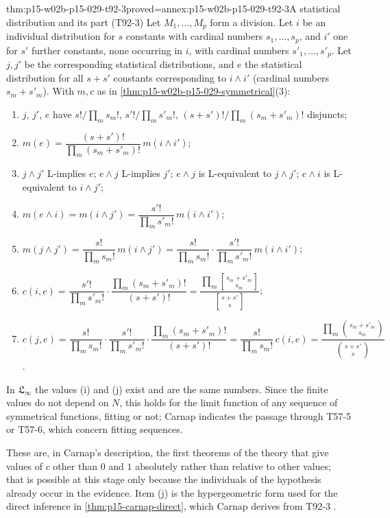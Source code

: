 \begin{hbtheorem}{thm:p15-w02b-p15-029-t92-3}{proved=annex:p15-w02b-p15-029-t92-3}{A statistical distribution and its part (T92-3)}
Let \(M_1,\ldots,M_p\) form a division. Let \(i\) be an individual
distribution for \(s\) constants with cardinal numbers
\(s_1,\ldots,s_p\), and \(i'\) one for \(s'\) further constants, none
occurring in \(i\), with cardinal numbers \(s'_1,\ldots,s'_p\). Let
\(j,j'\) be the corresponding statistical distributions, and \(e\) the
statistical distribution for all \(s+s'\) constants corresponding to
\(i\land i'\) (cardinal numbers \(s_m+s'_m\)). With \(m,c\) as in
\cref{thm:p15-w02b-p15-029-symmetrical}(3):
\begin{enumerate}
 \item[(a)] \(j\), \(j'\), \(e\) have \(s!/\prod_ms_m!\),
       \(s'!/\prod_ms'_m!\), \((s+s')!/\prod_m(s_m+s'_m)!\) disjuncts;
 \item[(b)] \(m(e)=\dfrac{(s+s')!}{\prod_m(s_m+s'_m)!}\,m(i\land i')\);
 \item[(c)--(f)] \(j\land j'\) L-implies \(e\); \(e\land j\) L-implies
       \(j'\); \(e\land j\) is L-equivalent to \(j\land j'\); \(e\land i\)
       is L-equivalent to \(i\land j'\);
 \item[(g)] \(m(e\land i)=m(i\land j')=\dfrac{s'!}{\prod_ms'_m!}\,m(i\land i')\);
 \item[(h)] \(m(j\land j')=\dfrac{s!}{\prod_ms_m!}\,m(i\land j')
       =\dfrac{s!}{\prod_ms_m!}\cdot\dfrac{s'!}{\prod_ms'_m!}\,m(i\land i')\);
 \item[(i)] \(c(i,e)=\dfrac{s'!}{\prod_ms'_m!}\cdot
       \dfrac{\prod_m(s_m+s'_m)!}{(s+s')!}
       =\dfrac{\prod_m\genfrac{[}{]}{0pt}{}{s_m+s'_m}{s_m}}{\genfrac{[}{]}{0pt}{}{s+s'}{s}}\);
 \item[(j)] \(c(j,e)=\dfrac{s!}{\prod_ms_m!}\cdot\dfrac{s'!}{\prod_ms'_m!}
       \cdot\dfrac{\prod_m(s_m+s'_m)!}{(s+s')!}
       =\dfrac{s!}{\prod_ms_m!}\,c(i,e)
       =\dfrac{\prod_m\binom{s_m+s'_m}{s_m}}{\binom{s+s'}{s}}\).
\end{enumerate}
In \(\mathfrak L_\infty\) the values (i) and (j) exist and are the same
numbers. Since the finite values do not depend on \(N\), this holds for
the limit function of any sequence of symmetrical functions, fitting or
not; Carnap indicates the passage through T57-5 or T57-6, which concern
fitting sequences.
\end{hbtheorem}

These are, in Carnap's description, the first theorems of the theory
that give values of \(c\) other than \(0\) and \(1\) absolutely rather
than relative to other values; that is possible at this stage only
because the individuals of the hypothesis already occur in the
evidence. Item (j) is the hypergeometric form used for the direct
inference in \cref{thm:p15-carnap-direct}, which Carnap derives from
T92-3 \cite[T92-3 and remarks, pp.~490--492; T94-1]{Carnap1950Probability}.

